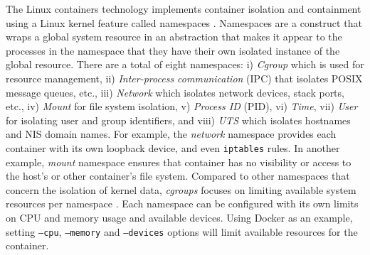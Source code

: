 \documentclass[english, 12pt, a4paper, sci, utf8, a-2b, online]{aaltothesis}
\begin{document}
The Linux containers technology implements container isolation and containment using a Linux kernel feature called namespaces \cite{lin2018measurement}.
Namespaces \cite{manpages-namespace} are a construct that wraps a global system resource in an abstraction that makes it appear to the processes in the namespace that they have their own isolated instance of the global resource.
There are a total of eight namespaces: i) \emph{Cgroup} which is used for resource management, ii) \emph{Inter-process communication} (IPC) that isolates POSIX message queues, etc., iii) \emph{Network} which isolates network devices, stack ports, etc., iv) \emph{Mount} for file system isolation, v) \emph{Process ID} (PID), vi) \emph{Time}, vii) \emph{User} for isolating user and group identifiers, and viii) \emph{UTS} which isolates hostnames and NIS domain names.
For example, the \emph{network} namespace provides each container with its own loopback device, and even \texttt{iptables} rules.
In another example, \emph{mount} namespace ensures that container has no visibility or access to the host's or other container's file system.
Compared to other namespaces that concern the isolation of kernel data, \emph{cgroups} focuses on limiting available system resources per namespace \cite{lin2018measurement}.
Each namespace can be configured with its own limits on CPU and memory usage and available devices.
Using Docker as an example, setting \texttt{--cpu}, \texttt{--memory} and \texttt{--devices} options will limit available resources for the container.
\end{document}
